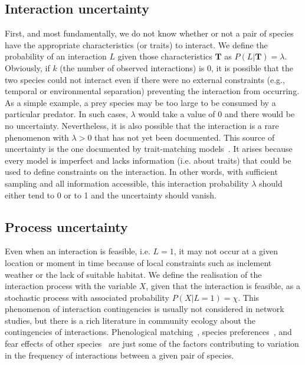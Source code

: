 \documentclass[12pt]{article}
\begin{document}
\begin{spacing}{2.0}
    \subsection*{Interaction uncertainty} 

    First, and most fundamentally, we do not know whether or not a pair of species have the appropriate characteristics (or traits) to interact. We define the probability of an interaction $L$ given those characteristics $\mathbf{T}$ as $P(L | \mathbf{T})=\lambda$. Obviously, if $k$ (the number of observed interactions) is 0, it is possible that the two species could not interact even if there were no external constraints (e.g., temporal or environmental separation) preventing the interaction from occurring. As a simple example, a prey species may be too large to be consumed by a particular predator. In such cases, $\lambda$ would take a value of 0 and there would be no uncertainty. 
    Nevertheless, it is also possible that the interaction is a rare phenomenon with $\lambda>0$ that has not yet been documented. This source of uncertainty is the one documented by trait-matching models~\citep{Bartomeus2016}. It arises because every model is imperfect and lacks information (i.e. about traits) that could be used to define constraints on the interaction. In other words, with sufficient sampling and all information accessible, this interaction probability $\lambda$ should either tend to 0 or to 1 and the uncertainty should vanish. 


    \subsection*{Process uncertainty} 

    Even when an interaction is feasible, i.e. $L=1$, it may not occur at a given location or moment in time because of local constraints such as inclement weather or the lack of suitable habitat. We define the realisation of the interaction process with the variable $X$, given that the interaction is feasible, as a stochastic process with associated probability $P(X|L=1)=\chi$. This phenomenon of interaction contingencies is usually not considered in network studies, but there is a rich literature in community ecology about the contingencies of interactions. Phenological matching~\citep{MillerRushing2010,Gezon2016}, species preferences~\citep{Pires2011,Novak2015,Coux2016}, and fear effects of other species~\citep{Luttbeg2005,Wirsing2008} are just some of the factors contributing to variation in the frequency of interactions between a given pair of species.


\end{spacing}
\end{document}
